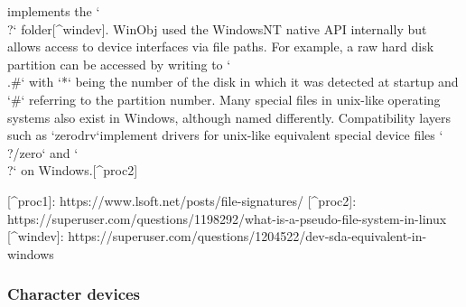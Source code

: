 implements the `\\?\Device` folder[^windev]. WinObj used the WindowsNT native API internally but allows access to device interfaces
via file paths. For example, a raw hard disk partition can be accessed by writing to `\\.\Device\Harddisk*\partition#`
with `*` being the number of the disk in which it was detected at startup and `#` referring to the partition number.
Many special files in unix-like operating systems also exist in Windows, although named differently. Compatibility layers
such as `zerodrv`implement drivers for unix-like equivalent special device files `\\?\Device/zero` and `\\?\Devices\null`
on Windows.[^proc2]

[^proc1]: https://www.lsoft.net/posts/file-signatures/
[^proc2]: https://superuser.com/questions/1198292/what-is-a-pseudo-file-system-in-linux
[^windev]: https://superuser.com/questions/1204522/dev-sda-equivalent-in-windows
\subsubsection{Character devices}
